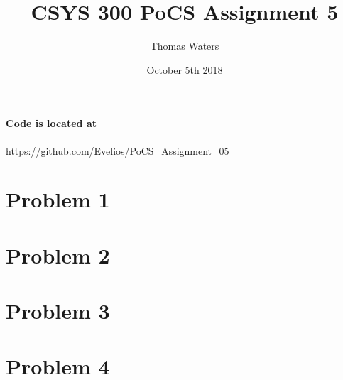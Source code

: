 \documentclass{article}
\title{CSYS 300 PoCS Assignment 5}
\author{Thomas Waters}
\date{October 5th 2018}
\begin{document}
\maketitle

\paragraph{Code is located at}
https://github.com/Evelios/PoCS\_Assignment\_05

\break

\section{Problem 1}


\section{Problem 2}


\section{Problem 3}


\section{Problem 4}

\end{document}

